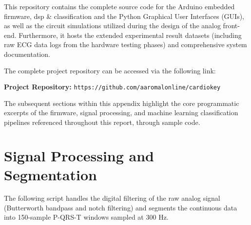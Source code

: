 \documentclass[12pt,a4paper]{report}
\begin{document}
This repository contains the complete source code for the Arduino embedded firmware, dsp \& classification and the Python Graphical User Interfaces (GUIs), as well as the circuit simulations utilized during the design of the analog front-end. Furthermore, it hosts the extended experimental result datasets (including raw ECG data logs from the hardware testing phases) and comprehensive system documentation.

The complete project repository can be accessed via the following link:

\vspace{10pt}
\begin{center}
    \textbf{Project Repository:} \texttt{https://github.com/aaromalonline/cardiokey} %
\end{center}
\vspace{10pt}

The subsequent sections within this appendix highlight the core programmatic excerpts of the firmware, signal processing, and machine learning classification pipelines referenced throughout this report, through sample code.

\section{Signal Processing and Segmentation}
The following script handles the digital filtering of the raw analog signal (Butterworth bandpass and notch filtering) and segments the continuous data into 150-sample P-QRS-T windows sampled at 300 Hz.
\end{document}
